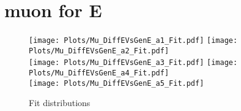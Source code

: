 \documentclass[a4paper,10pt]{article}
\begin{document}
 \newpage \section{muon for E}
\begin{figure}[h!b] 
  \texttt{[image: Plots/Mu\_DiffEVsGenE\_a1\_Fit.pdf]} 
  \texttt{[image: Plots/Mu\_DiffEVsGenE\_a2\_Fit.pdf]} \\ 
  \texttt{[image: Plots/Mu\_DiffEVsGenE\_a3\_Fit.pdf]} 
  \texttt{[image: Plots/Mu\_DiffEVsGenE\_a4\_Fit.pdf]} \\ 
  \texttt{[image: Plots/Mu\_DiffEVsGenE\_a5\_Fit.pdf]} 
\caption{Fit distributions} 
\end{figure} 
\end{document}
